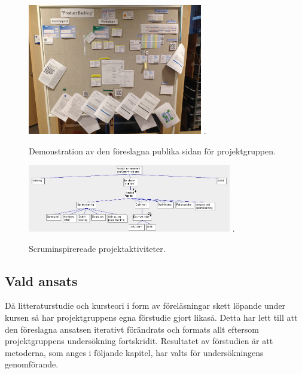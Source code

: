 \documentclass[conference,a4paper]{IEEEtran}
\begin{document}
\begin{figure}[H]
\centering
\includegraphics[width=3in]{forslagriktigproduct}
\DeclareGraphicsExtensions.
\caption{Demonstration av den föreslagna publika sidan för projektgruppen.}
\label{forslagriktigproduct}
\end{figure}

\begin{figure}[H]
\centering
\includegraphics[width=3.5in]{scrum}
\DeclareGraphicsExtensions.
\caption{Scruminspirereade projektaktiviteter.}
\label{scruminspo}
\end{figure}

\subsection{Vald ansats}
Då litteraturstudie och kursteori i form av föreläsningar skett löpande under kursen så har projektgruppens egna förstudie gjort likaså. Detta har lett till att den föreslagna ansatsen iterativt förändrats och formats allt eftersom projektgruppens undersökning fortskridit.
Resultatet av förstudien är att metoderna, som anges i följande kapitel, har valts för undersökningens genomförande.
\end{document}
